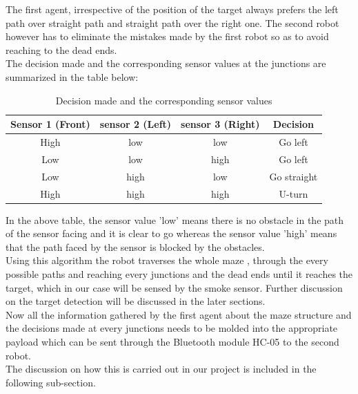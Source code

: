 \justify The first agent, irrespective of the position of the target always prefers the left path over straight path and straight path over the right one. The second robot however has to eliminate the mistakes made by the first robot so as to avoid reaching to the dead ends.\\
The decision made and the corresponding sensor values at the junctions are summarized in the table below:
\begin{table}[h]
\begin{center}
\begin{tabular}{ |c|c|c|c| }
\hline 
Sensor 1 (Front)&	sensor 2 (Left)	&sensor 3 (Right)&	Decision\\
\hline
High&	low	&low& 	Go left\\
\hline
Low	&low	&high&	Go left\\
\hline
Low&	high&	low	&Go straight\\
\hline
High&	high&	high&	U-turn\\
\hline
\end{tabular}
\caption{Decision made and the corresponding sensor values}
\end{center}
\end{table}
In the above table, the sensor value 'low' means there is no obstacle in the path of the sensor facing and it is clear to go whereas the sensor value 'high' means that the path faced by the sensor is blocked by the obstacles.\\
Using this algorithm the robot traverses the whole maze , through the every possible paths and reaching every junctions and the dead ends until it reaches the target, which in our case will be sensed by the smoke sensor. Further discussion on the target detection will be discussed in the later sections.\\
Now all the information gathered by the first agent about the maze structure and the decisions made at every junctions needs to be molded into the appropriate payload which can be sent through the Bluetooth module HC-05 to the second robot.\\
The discussion on how this is carried out in our project is included in the following sub-section.
